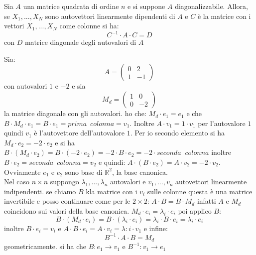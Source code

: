 \documentclass[a4paper,12pt, oneside]{book}
\begin{document}
\begin{teorema}
	Sia $A$ una matrice quadrata di ordine $n$ e si suppone $A$ diagonalizzabile. Allora, se $X_1,...,X_N$ sono autovettori linearmente dipendenti di $A$ e $C$ è la matrice con i vettori $X_1,...,X_N$ come colonne si ha:
	$$C^{-1}\cdot A \cdot C=D$$
	con $D$ matrice diagonale degli autovalori di $A$
\end{teorema}
Sia:
$$
	A=\left(\begin{matrix}
			0 & 2  \\
			1 & -1
		\end{matrix}\right)
$$
con autovalori $1 $ e $-2$ e sia $$
	M_d=\left(\begin{matrix}
			1 & 0  \\
			0 & -2
		\end{matrix}\right)
$$ la matrice diagonale con gli autovalori.
ho che: $M_d\cdot e_1=e_1$ e che $B\cdot M_d\cdot e_1=B\cdot e_1= prima \,\,\, colonna=v_1$. Inoltre $A\cdot v_1=1\cdot v_1$ per l'autovalore $1$ quindi $v_1$ è l'autovettore dell'autovalore $1$. Per io secondo elemento si ha  $M_d\cdot e_2=-2\cdot e_2$ e si ha $B\cdot(M_d\cdot e_2)=B\cdot (-2\cdot e_2)=-2\cdot B\cdot e_2=-2\cdot seconda\,\,\ colonna$
inoltre $B\cdot e_2=seconda\,\,\, colonna=v_2$ e quindi: $A\cdot(B\cdot e_2)=A\cdot v_2=-2\cdot v_2$. Ovviamente $e_1$ e $e_2$ sono base di $\mathbb{R}^2$, la base canonica.\\
Nel caso $n\times n$ suppongo $\lambda_1,...,\lambda_n$ autovalori e $v_1,...,v_n$ autovettori linearmente indipendenti. se chiamo $B$ kla matrice con i $v_i$ sulle colonne questa è una matrice invertibile e posso continuare come per le $2\times 2$: $A\cdot B= B\cdot M_d$ infatti $A$ e $M_d$ coincidono sui valori della base canonica. $M_d\cdot e_i=\lambda_i\cdot e_i$ poi applico $B$: $$B\cdot (M_d\cdot e_i)=B\cdot(\lambda_i\cdot e_i)=\lambda_i\cdot B\cdot e_i=\lambda_i\cdot e_i$$
inoltre $B\cdot e_i=v_i$ e $A\cdot B\cdot e_i=A\cdot v_i=\lambda:i\cdot v_1$ e infine:
$$B^{-1}\cdot A\cdot B=M_d$$
geometricamente. si ha che $B:e_1\to v_1$ e $B^{-1}:v_1\to e_1$
\end{document}
